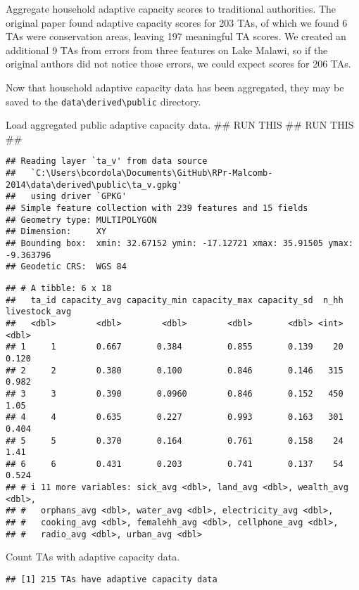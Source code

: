 \documentclass[
]{article}
\begin{document}
Aggregate household adaptive capacity scores to traditional authorities.
The original paper found adaptive capacity scores for 203 TAs, of which
we found 6 TAs were conservation areas, leaving 197 meaningful TA
scores. We created an additional 9 TAs from errors from three features
on Lake Malawi, so if the original authors did not notice those errors,
we could expect scores for 206 TAs.

Now that household adaptive capacity data has been aggregated, they may
be saved to the
\texttt{data\textbackslash{}derived\textbackslash{}public} directory.

Load aggregated public adaptive capacity data. \#\# RUN THIS \#\# RUN
THIS \#\#

\begin{verbatim}
## Reading layer `ta_v' from data source 
##   `C:\Users\bcordola\Documents\GitHub\RPr-Malcomb-2014\data\derived\public\ta_v.gpkg' 
##   using driver `GPKG'
## Simple feature collection with 239 features and 15 fields
## Geometry type: MULTIPOLYGON
## Dimension:     XY
## Bounding box:  xmin: 32.67152 ymin: -17.12721 xmax: 35.91505 ymax: -9.363796
## Geodetic CRS:  WGS 84
\end{verbatim}

\begin{verbatim}
## # A tibble: 6 x 18
##   ta_id capacity_avg capacity_min capacity_max capacity_sd  n_hh livestock_avg
##   <dbl>        <dbl>        <dbl>        <dbl>       <dbl> <int>         <dbl>
## 1     1        0.667       0.384         0.855       0.139    20         0.120
## 2     2        0.380       0.100         0.846       0.146   315         0.982
## 3     3        0.390       0.0960        0.846       0.152   450         1.05 
## 4     4        0.635       0.227         0.993       0.163   301         0.404
## 5     5        0.370       0.164         0.761       0.158    24         1.41 
## 6     6        0.431       0.203         0.741       0.137    54         0.524
## # i 11 more variables: sick_avg <dbl>, land_avg <dbl>, wealth_avg <dbl>,
## #   orphans_avg <dbl>, water_avg <dbl>, electricity_avg <dbl>,
## #   cooking_avg <dbl>, femalehh_avg <dbl>, cellphone_avg <dbl>,
## #   radio_avg <dbl>, urban_avg <dbl>
\end{verbatim}

Count TAs with adaptive capacity data.

\begin{verbatim}
## [1] 215 TAs have adaptive capacity data
\end{verbatim}
\end{document}

